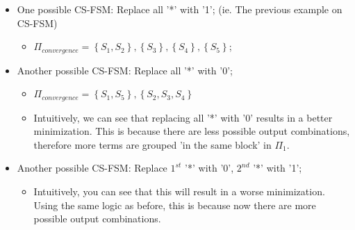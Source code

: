 \documentclass{article}
\begin{document}
\begin{itemize}
    \item One possible CS-FSM: Replace all '*' with '1'; (ie. The previous example on CS-FSM)
        \begin{itemize}
            \item $\Pi_{convergence} = \left\{ S_{1},S_{2} \right\},  
                                       \left\{ S_{3} \right\},
                                       \left\{ S_{4} \right\}, 
                                       \left\{ S_{5} \right\}$;
        \end{itemize}
    \item Another possible CS-FSM: Replace all '*' with '0'; 
        \begin{itemize}
            \item $\Pi_{convergence} = \left\{ S_{1},S_{5} \right\},
                                       \left\{ S_{2},S_{3},S_{4} \right\}$
            \item Intuitively, we can see that replacing all '*' with '0' results in a better minimization.
                  This is because there are less possible output combinations, therefore more terms are grouped 'in the same block' in $\Pi_{1}$.
        \end{itemize}
    \item Another possible CS-FSM: Replace $1^{st}$ '*' with '0', $2^{nd}$ '*' with '1'; 
        \begin{itemize}
            \item Intuitively, you can see that this will result in a worse minimization.
                  Using the same logic as before, this is because now there are more possible output combinations.
        \end{itemize}
\end{itemize}
\end{document}
